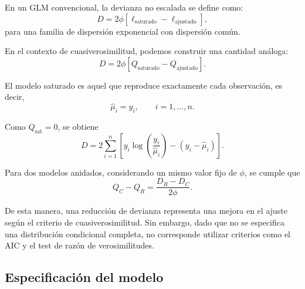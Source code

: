 \documentclass[12pt, a4paper]{article}
\numberwithin{equation}{section}
\begin{document}
En un GLM convencional, la devianza no escalada se define como:
\[
D=2\phi\left[
\ell_{\text{saturado}}-\ell_{\text{ajustado}}
\right],
\]
para una familia de dispersión exponencial con dispersión común.

En el contexto de cuasiverosimilitud, podemos construir una
cantidad análoga:
\[
D=2\phi\left[
Q_{\text{saturado}}-Q_{\text{ajustado}}
\right].
\]
\newpage

El modelo saturado es aquel que reproduce exactamente cada
observación, es decir,
\[
\hat{\mu}_i=y_i,\qquad i=1,\ldots,n.
\]

Como $Q_{\text{sat}}=0$, se obtiene
\[
D=2\sum_{i=1}^{n}
\left[
y_i\log\left(\frac{y_i}{\hat{\mu}_i}\right)
-(y_i-\hat{\mu}_i)
\right].
\]

Para dos modelos anidados, considerando un mismo
valor fijo de $\phi$, se cumple que
\[
Q_C-Q_R=\frac{D_R-D_C}{2\phi}.
\]

De esta manera, una reducción de devianza representa
una mejora en el ajuste según el criterio de
cuasiverosimilitud.
Sin embargo, dado que no se
especifica una distribución condicional completa,
no corresponde utilizar criterios como el AIC y el
test de razón de verosimilitudes.


\subsection{Especificación del modelo}
\end{document}

